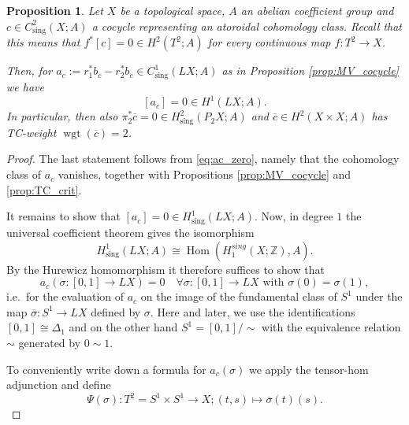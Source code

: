 \documentclass[a4paper,twoside]{article}
\theoremstyle{plain}
\newtheorem{proposition}[theorem]{Proposition}
\theoremstyle{definition}
\theoremstyle{remark}
\newcommand{\integers}{\mathbb{Z}}
\newcommand{\iso}{\cong}
\DeclareMathOperator{\sing}{sing}
\DeclareMathOperator{\Hom}{Hom}    %
\DeclareMathOperator{\wgt}{wgt}
\begin{document}
\begin{proposition}\label{prop:vanish_ac}
  Let $X$ be a topological space, $A$ an abelian coefficient group and  $c\in
  C^2_{\sing}(X;A)$ a cocycle representing an atoroidal cohomology
  class. Recall that this means  that $f^*[c]=0\in H^2(T^2;A)$ for every continuous map $f\colon
  T^2\to X$.

  Then, for $a_c:=r_1^*b_c-r_2^*b_c\in C^1_{\sing}(LX;A)$ as in
  Proposition \ref{prop:MV_cocycle} we have
  \begin{equation}\label{eq:ac_zero}
    [a_c]=0 \in H^1(LX;A).
  \end{equation}
  In particular, then also $\pi_2^*\overline{c} = 0 \in H^2_{\sing}(P_2X;A)$
  and $\overline{c}\in H^2(X\times X;A)$ has TC-weight $\wgt(\overline{c})=2$.
\end{proposition}
\begin{proof}
  The last statement follows from \eqref{eq:ac_zero}, namely that the cohomology class of $a_c$
  vanishes, together with Propositions \ref{prop:MV_cocycle} and
  \ref{prop:TC_crit}.

  It remains to show that $[a_c]=0\in H^1_{\sing}(LX;A)$. Now, in degree $1$
  the universal coefficient theorem gives the isomorphism
  \begin{equation*}
      H_{\sing}^1(LX;A) \iso \Hom(H^{sing}_1(X;\integers),A).
  \end{equation*}
  By the Hurewicz
  homomorphism it therefore suffices to show that
  \begin{equation*}
    a_c(\sigma\colon
    [0,1]\to LX)=0 \quad\forall \sigma\colon [0,1]\to LX \text{ with }
    \sigma(0)=\sigma(1),
  \end{equation*}
  i.e.~for the evaluation of $a_c$ on the image of the
  fundamental class of $S^1$ under the map $\overline \sigma\colon S^1\to
  LX$ defined by $\sigma$. Here and later, we use the identifications $[0,1]\iso\Delta_1$ and on
  the other hand $S^1= [0,1]/\sim$ with the equivalence relation $\sim$ generated by $0\sim 1$.

  To conveniently write down a formula for $a_c(\sigma)$ we apply the tensor-hom adjunction and define
  \begin{equation*}
    \Psi(\sigma)\colon T^2=S^1\times S^1\to X; (t,s)\mapsto \overline \sigma(t)(s).
  \end{equation*}


\end{proof}
\end{document}
